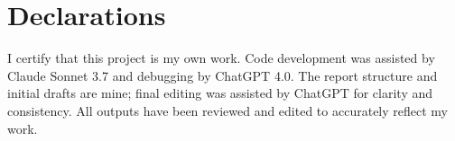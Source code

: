 
\chapter*{Declarations}
I certify that this project is my own work. Code development was assisted by Claude Sonnet 3.7 and debugging by ChatGPT 4.0. The report structure and initial drafts are mine; final editing was assisted by ChatGPT for clarity and consistency. All outputs have been reviewed and edited to accurately reflect my work.